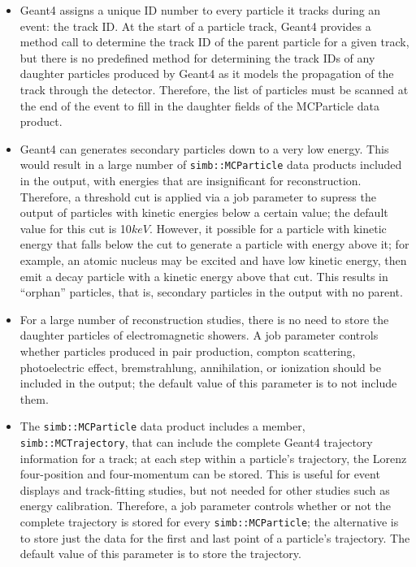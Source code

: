\documentclass[12pt]{elsarticle}
\begin{document}
\begin{itemize}

\item Geant4 assigns a unique ID number to every particle it tracks
  during an event: the track ID. At the start of a particle track,
  Geant4 provides a method call to determine the track ID of the
  parent particle for a given track, but there is no predefined method
  for determining the track IDs of any daughter particles produced by
  Geant4 as it models the propagation of the track through the
  detector. Therefore, the list of particles must be scanned at the
  end of the event to fill in the daughter fields of the MCParticle
  data product.

\item Geant4 can generates secondary particles down to a very low
  energy. This would result in a large number of {\tt simb::MCParticle} data
  products included in the output, with energies that are
  insignificant for reconstruction. Therefore, a threshold cut is
  applied via a job parameter to supress the output of particles with
  kinetic energies below a certain value; the default value for this
  cut is 10$keV$. However, it possible for a particle with kinetic
  energy that falls below the cut to generate a particle with energy
  above it; for example, an atomic nucleus may be excited and have low
  kinetic energy, then emit a decay particle with a kinetic energy
  above that cut. This results in ``orphan'' particles, that is,
  secondary particles in the output with no parent. 

\item For a large number of reconstruction studies, there is no need
  to store the daughter particles of electromagnetic showers. A job
  parameter controls whether particles produced in pair production,
  compton scattering, photoelectric effect, bremstrahlung,
  annihilation, or ionization should be included in the output; the
  default value of this parameter is to not include them. 

\item The {\tt simb::MCParticle} data product includes a member, {\tt
  simb::MCTrajectory}, that can include the complete Geant4 trajectory
  information for a track; at each step within a particle's
  trajectory, the Lorenz four-position and four-momentum can be
  stored. This is useful for event displays and track-fitting studies,
  but not needed for other studies such as energy
  calibration. Therefore, a job parameter controls whether or not the
  complete trajectory is stored for every {\tt simb::MCParticle}; the
  alternative is to store just the data for the first and last point
  of a particle's trajectory. The default value of this parameter is
  to store the trajectory.

\end{itemize}
\end{document}

